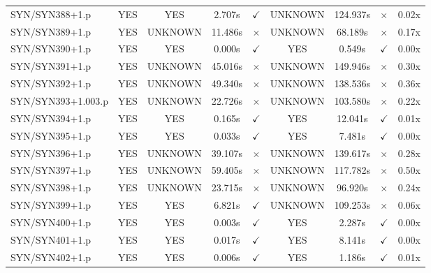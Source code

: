 \documentclass[a4paper,10pt]{article}
\begin{document}
\begin{longtable}{lcccccccc}
SYN/SYN388+1.p & YES & YES & 2.707s & \cellcolor{matchcolor}$\checkmark$ & UNKNOWN & 124.937s & \cellcolor{mismatchcolor}$\times$ & 0.02x \\
SYN/SYN389+1.p & YES & UNKNOWN & 11.486s & \cellcolor{mismatchcolor}$\times$ & UNKNOWN & 68.189s & \cellcolor{mismatchcolor}$\times$ & 0.17x \\
SYN/SYN390+1.p & YES & YES & 0.000s & \cellcolor{matchcolor}$\checkmark$ & YES & 0.549s & \cellcolor{matchcolor}$\checkmark$ & 0.00x \\
SYN/SYN391+1.p & YES & UNKNOWN & 45.016s & \cellcolor{mismatchcolor}$\times$ & UNKNOWN & 149.946s & \cellcolor{mismatchcolor}$\times$ & 0.30x \\
SYN/SYN392+1.p & YES & UNKNOWN & 49.340s & \cellcolor{mismatchcolor}$\times$ & UNKNOWN & 138.536s & \cellcolor{mismatchcolor}$\times$ & 0.36x \\
SYN/SYN393+1.003.p & YES & UNKNOWN & 22.726s & \cellcolor{mismatchcolor}$\times$ & UNKNOWN & 103.580s & \cellcolor{mismatchcolor}$\times$ & 0.22x \\
SYN/SYN394+1.p & YES & YES & 0.165s & \cellcolor{matchcolor}$\checkmark$ & YES & 12.041s & \cellcolor{matchcolor}$\checkmark$ & 0.01x \\
SYN/SYN395+1.p & YES & YES & 0.033s & \cellcolor{matchcolor}$\checkmark$ & YES & 7.481s & \cellcolor{matchcolor}$\checkmark$ & 0.00x \\
SYN/SYN396+1.p & YES & UNKNOWN & 39.107s & \cellcolor{mismatchcolor}$\times$ & UNKNOWN & 139.617s & \cellcolor{mismatchcolor}$\times$ & 0.28x \\
SYN/SYN397+1.p & YES & UNKNOWN & 59.405s & \cellcolor{mismatchcolor}$\times$ & UNKNOWN & 117.782s & \cellcolor{mismatchcolor}$\times$ & 0.50x \\
SYN/SYN398+1.p & YES & UNKNOWN & 23.715s & \cellcolor{mismatchcolor}$\times$ & UNKNOWN & 96.920s & \cellcolor{mismatchcolor}$\times$ & 0.24x \\
SYN/SYN399+1.p & YES & YES & 6.821s & \cellcolor{matchcolor}$\checkmark$ & UNKNOWN & 109.253s & \cellcolor{mismatchcolor}$\times$ & 0.06x \\
SYN/SYN400+1.p & YES & YES & 0.003s & \cellcolor{matchcolor}$\checkmark$ & YES & 2.287s & \cellcolor{matchcolor}$\checkmark$ & 0.00x \\
SYN/SYN401+1.p & YES & YES & 0.017s & \cellcolor{matchcolor}$\checkmark$ & YES & 8.141s & \cellcolor{matchcolor}$\checkmark$ & 0.00x \\
SYN/SYN402+1.p & YES & YES & 0.006s & \cellcolor{matchcolor}$\checkmark$ & YES & 1.186s & \cellcolor{matchcolor}$\checkmark$ & 0.01x \\

\end{longtable}
\end{document}
